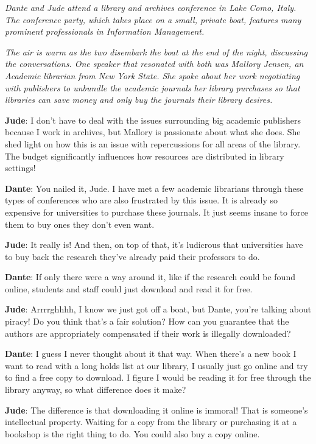 \documentclass[
  letterpaper,
  DIV=11,
  numbers=noendperiod]{scrreprt}
\begin{document}
\emph{Dante and Jude attend a library and archives conference in Lake
Como, Italy. The conference party, which takes place on a small, private
boat, features many prominent professionals in Information Management.}

\emph{The air is warm as the two disembark the boat at the end of the
night, discussing the conversations. One speaker that resonated with
both was Mallory Jensen, an Academic librarian from New York State. She
spoke about her work negotiating with publishers to unbundle the
academic journals her library purchases so that libraries can save money
and only buy the journals their library desires.}

\textbf{Jude}: I don't have to deal with the issues surrounding big
academic publishers because I work in archives, but Mallory is
passionate about what she does. She shed light on how this is an issue
with repercussions for all areas of the library. The budget
significantly influences how resources are distributed in library
settings!

\textbf{Dante}: You nailed it, Jude. I have met a few academic
librarians through these types of conferences who are also frustrated by
this issue. It is already so expensive for universities to purchase
these journals. It just seems insane to force them to buy ones they
don't even want.

\textbf{Jude}: It really is! And then, on top of that, it's ludicrous
that universities have to buy back the research they've already paid
their professors to do.

\textbf{Dante}: If only there were a way around it, like if the research
could be found online, students and staff could just download and read
it for free.

\textbf{Jude}: Arrrrghhhh, I know we just got off a boat, but Dante,
you're talking about piracy! Do you think that's a fair solution? How
can you guarantee that the authors are appropriately compensated if
their work is illegally downloaded?

\textbf{Dante}: I guess I never thought about it that way. When there's
a new book I want to read with a long holds list at our library, I
usually just go online and try to find a free copy to download. I figure
I would be reading it for free through the library anyway, so what
difference does it make?

\textbf{Jude}: The difference is that downloading it online is immoral!
That is someone's intellectual property. Waiting for a copy from the
library or purchasing it at a bookshop is the right thing to do. You
could also buy a copy online.
\end{document}

